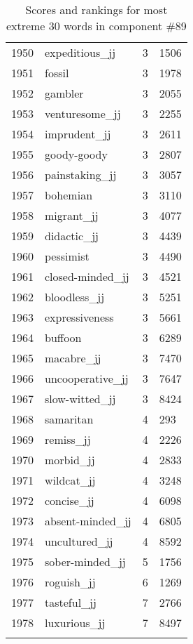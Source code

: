 \begin{longtable}[!htbp]{| rlr@{.}l |}
    1950 & expeditious\_jj & 3 & 1506 \\
    1951 & fossil & 3 & 1978 \\
    1952 & gambler & 3 & 2055 \\
    1953 & venturesome\_jj & 3 & 2255 \\
    1954 & imprudent\_jj & 3 & 2611 \\
    1955 & goody-goody & 3 & 2807 \\
    1956 & painstaking\_jj & 3 & 3057 \\
    1957 & bohemian & 3 & 3110 \\
    1958 & migrant\_jj & 3 & 4077 \\
    1959 & didactic\_jj & 3 & 4439 \\
    1960 & pessimist & 3 & 4490 \\
    1961 & closed-minded\_jj & 3 & 4521 \\
    1962 & bloodless\_jj & 3 & 5251 \\
    1963 & expressiveness & 3 & 5661 \\
    1964 & buffoon & 3 & 6289 \\
    1965 & macabre\_jj & 3 & 7470 \\
    1966 & uncooperative\_jj & 3 & 7647 \\
    1967 & slow-witted\_jj & 3 & 8424 \\
    1968 & samaritan & 4 & 293 \\
    1969 & remiss\_jj & 4 & 2226 \\
    1970 & morbid\_jj & 4 & 2833 \\
    1971 & wildcat\_jj & 4 & 3248 \\
    1972 & concise\_jj & 4 & 6098 \\
    1973 & absent-minded\_jj & 4 & 6805 \\
    1974 & uncultured\_jj & 4 & 8592 \\
    1975 & sober-minded\_jj & 5 & 1756 \\
    1976 & roguish\_jj & 6 & 1269 \\
    1977 & tasteful\_jj & 7 & 2766 \\
    1978 & luxurious\_jj & 7 & 8497 \\
    \hline
    \caption{Scores and rankings for most extreme 30 words in component \#89} \\
\end{longtable}
